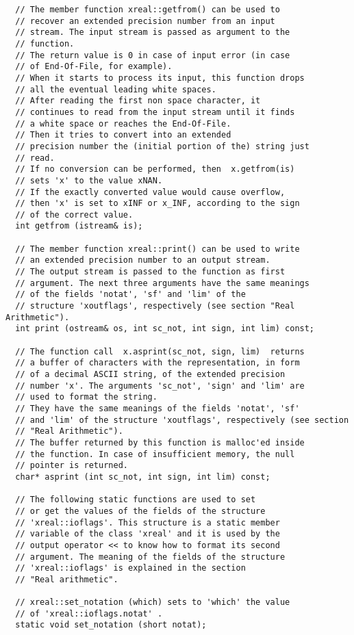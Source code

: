 \documentclass{article}
\begin{document}
\begin{verbatim}
  // The member function xreal::getfrom() can be used to 
  // recover an extended precision number from an input 
  // stream. The input stream is passed as argument to the
  // function. 
  // The return value is 0 in case of input error (in case
  // of End-Of-File, for example). 
  // When it starts to process its input, this function drops
  // all the eventual leading white spaces.
  // After reading the first non space character, it 
  // continues to read from the input stream until it finds
  // a white space or reaches the End-Of-File. 
  // Then it tries to convert into an extended
  // precision number the (initial portion of the) string just
  // read.
  // If no conversion can be performed, then  x.getfrom(is)
  // sets 'x' to the value xNAN.
  // If the exactly converted value would cause overflow,
  // then 'x' is set to xINF or x_INF, according to the sign
  // of the correct value.
  int getfrom (istream& is);

  // The member function xreal::print() can be used to write
  // an extended precision number to an output stream.
  // The output stream is passed to the function as first 
  // argument. The next three arguments have the same meanings
  // of the fields 'notat', 'sf' and 'lim' of the
  // structure 'xoutflags', respectively (see section "Real Arithmetic").
  int print (ostream& os, int sc_not, int sign, int lim) const;

  // The function call  x.asprint(sc_not, sign, lim)  returns
  // a buffer of characters with the representation, in form 
  // of a decimal ASCII string, of the extended precision 
  // number 'x'. The arguments 'sc_not', 'sign' and 'lim' are
  // used to format the string.
  // They have the same meanings of the fields 'notat', 'sf'
  // and 'lim' of the structure 'xoutflags', respectively (see section 
  // "Real Arithmetic").
  // The buffer returned by this function is malloc'ed inside
  // the function. In case of insufficient memory, the null 
  // pointer is returned.
  char* asprint (int sc_not, int sign, int lim) const;

  // The following static functions are used to set
  // or get the values of the fields of the structure
  // 'xreal::ioflags'. This structure is a static member
  // variable of the class 'xreal' and it is used by the
  // output operator << to know how to format its second
  // argument. The meaning of the fields of the structure
  // 'xreal::ioflags' is explained in the section 
  // "Real arithmetic".

  // xreal::set_notation (which) sets to 'which' the value
  // of 'xreal::ioflags.notat' .
  static void set_notation (short notat);


\end{verbatim}
\end{document}
